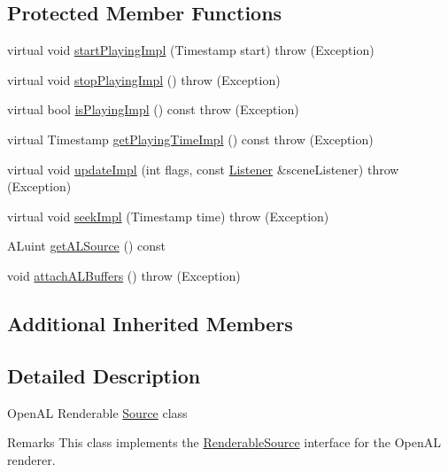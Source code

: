 \subsection*{Protected Member Functions}
\begin{DoxyCompactItemize}
\item 
virtual void \hyperlink{classAudio_1_1OpenALRenderableSource_af49fc3aa84d6dad21d75b7fa4bf4fbe1}{start\+Playing\+Impl} (Timestamp start)  throw (\+Exception)
\item 
virtual void \hyperlink{classAudio_1_1OpenALRenderableSource_aa2a89f65052507e51b1e71ec0dd21f12}{stop\+Playing\+Impl} ()  throw (\+Exception)
\item 
virtual bool \hyperlink{classAudio_1_1OpenALRenderableSource_ac80fe22a62943e49e6b25f8bc3bea7bd}{is\+Playing\+Impl} () const   throw (\+Exception)
\item 
virtual Timestamp \hyperlink{classAudio_1_1OpenALRenderableSource_aec860f7d058437a16626772e732a8459}{get\+Playing\+Time\+Impl} () const   throw (\+Exception)
\item 
virtual void \hyperlink{classAudio_1_1OpenALRenderableSource_a57503ddb02ef56fac0ca9830246aae31}{update\+Impl} (int flags, const \hyperlink{classAudio_1_1Listener}{Listener} \&scene\+Listener)  throw (\+Exception)
\item 
virtual void \hyperlink{classAudio_1_1OpenALRenderableSource_a5bd1d11d3aeb82b34304b7e952957be6}{seek\+Impl} (Timestamp time)  throw (\+Exception)
\item 
A\+Luint \hyperlink{classAudio_1_1OpenALRenderableSource_a531f21334659ceb3325ec8de98e319b9}{get\+A\+L\+Source} () const 
\item 
void \hyperlink{classAudio_1_1OpenALRenderableSource_ae1beb034a59b0ecea0fd7d0c8665aa7c}{attach\+A\+L\+Buffers} ()  throw (\+Exception)
\end{DoxyCompactItemize}
\subsection*{Additional Inherited Members}


\subsection{Detailed Description}
Open\+AL Renderable \hyperlink{classAudio_1_1Source}{Source} class

\begin{DoxyRemark}{Remarks}
This class implements the \hyperlink{classAudio_1_1RenderableSource}{Renderable\+Source} interface for the Open\+AL renderer. 
\end{DoxyRemark}


